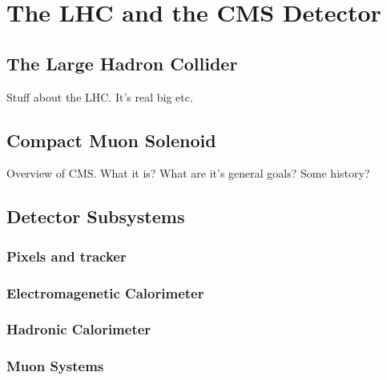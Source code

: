 \chapter{The LHC and the CMS Detector}

\ifpdf
    \graphicspath{{Chapter3/Figs/Raster/}{Chapter3/Figs/PDF/}{Chapter3/Figs/}}
\else
    \graphicspath{{Chapter3/Figs/Vector/}{Chapter3/Figs/}}
\fi


\section{The Large Hadron Collider}  %
\label{sec:detector_lhc}

Stuff about the LHC. It's real big etc.


\section{Compact Muon Solenoid}  %
\label{sec:detector_overview}

Overview of CMS. What it is? What are it's general goals? Some history?


\section{Detector Subsystems}  %
\label{sec:detector_subsystems}

\subsection{Pixels and tracker}

\subsection{Electromagenetic Calorimeter}

\subsection{Hadronic Calorimeter}

\subsection{Muon Systems}

